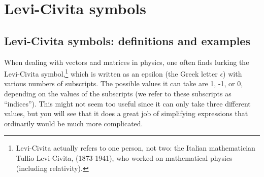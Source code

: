

\section{Levi-Civita symbols}\label{sec:LeviCivita}
\subsection{Levi-Civita symbols: definitions and examples}\label{subsec:LeviCivita}
When dealing with vectors and matrices in physics, one often finds lurking  the Levi-Civita symbol,\footnote{Levi-Civita actually refers to one person, not two: the Italian mathematician Tullio Levi-Civita, (1873-1941), who worked on mathematical physics (including relativity).} which is written as an epsilon (the Greek letter $\epsilon$) with various numbers of subscripts.  The possible values it can take are 1, -1, or 0, depending on the values of the subscripts (we refer to these subscripts as ``indices'').  This might not seem too useful since it can only take three different values, but you will see that it does a great job of simplifying expressions that ordinarily would be much more complicated.  

